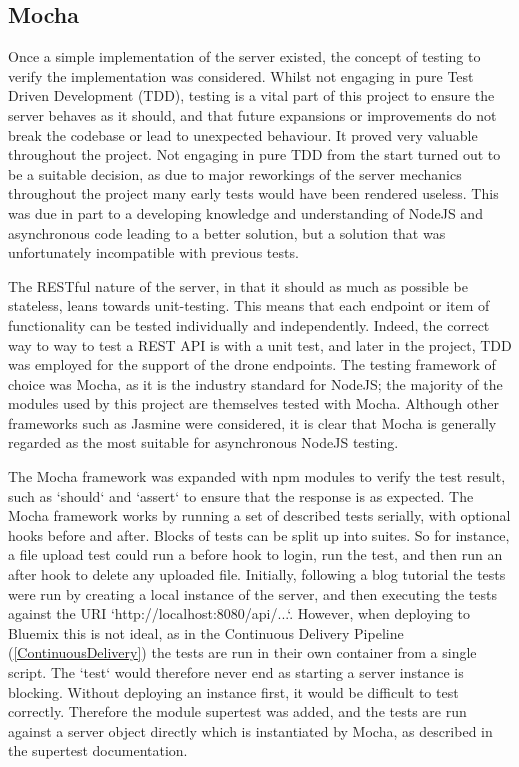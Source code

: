 \documentclass{article}
\begin{document}
\subsection{Mocha}\label{mochaTesting}
Once a simple implementation of the server existed, the concept of testing to verify the implementation was considered. Whilst not engaging in pure Test Driven Development (TDD), testing is a vital part of this project to ensure the server behaves as it should, and that future expansions or improvements do not break the codebase or lead to unexpected behaviour. It proved very valuable throughout the project. Not engaging in pure TDD from the start turned out to be a suitable decision, as due to major reworkings of the server mechanics throughout the project many early tests would have been rendered useless. This was due in part to a developing knowledge and understanding of NodeJS and asynchronous code leading to a better solution, but a solution that was unfortunately incompatible with previous tests. 

The RESTful nature of the server, in that it should as much as possible be stateless, leans towards unit-testing. This means that each endpoint or item of functionality can be tested individually and independently. Indeed, the correct way to way to test a REST API is with a unit test\cite{mardan2014tdd}, and later in the project, TDD was employed for the support of the drone endpoints. The testing framework of choice was Mocha, as it is the industry standard for NodeJS; the majority of the modules used by this project are themselves tested with Mocha. Although other frameworks such as Jasmine\cite{jasmine} were considered, it is clear that Mocha is generally regarded as the most suitable for asynchronous NodeJS testing\cite{testingReview}. 

The Mocha framework was expanded with npm modules to verify the test result, such as `should` and `assert` to ensure that the response is as expected. The Mocha framework works by running a set of described tests serially, with optional hooks before and after. Blocks of tests can be split up into suites. So for instance, a file upload test could run a before hook to login, run the test, and then run an after hook to delete any uploaded file. Initially, following a blog tutorial\cite{thewayofcode} the tests were run by creating a local instance of the server, and then executing the tests against the URI `http://localhost:8080/api/...`. However, when deploying to Bluemix this is not ideal, as in the Continuous Delivery Pipeline (\ref{ContinuousDelivery}) the tests are run in their own container from a single script. The `test` would therefore never end as starting a server instance is blocking. Without deploying an instance first, it would be difficult to test correctly. Therefore the module supertest was added, and the tests are run against a server object directly which is instantiated by Mocha, as described in the supertest documentation\cite{supertest}.
\end{document}

